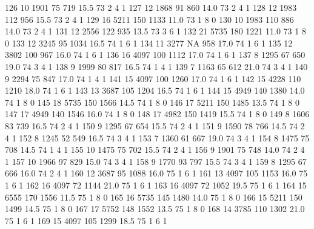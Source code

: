 \documentclass{article}
\begin{document}
\begin{Schunk}
\begin{Soutput}
126      10  1901  75  719 15.5  73      2       4        1
127      12  1868  91  860 14.0  73      2       4        1
128      12  1983 112  956 15.5  73      2       4        1
129      16  5211 150 1133 11.0  73      1       8        0
130      10  1983 110  886 14.0  73      2       4        1
131      12  2556 122  935 13.5  73      3       6        1
132      21  5735 180 1221 11.0  73      1       8        0
133      12  3245  95 1034 16.5  74      1       6        1
134      11  3277  NA  958 17.0  74      1       6        1
135      12  3802 100  967 16.0  74      1       6        1
136      16  4097 100 1112 17.0  74      1       6        1
137       8  1295  67  650 19.0  74      3       4        1
138       9  1999  80  817 16.5  74      1       4        1
139       7  1163  65  612 21.0  74      3       4        1
140       9  2294  75  847 17.0  74      1       4        1
141      15  4097 100 1260 17.0  74      1       6        1
142      15  4228 110 1210 18.0  74      1       6        1
143      13  3687 105 1204 16.5  74      1       6        1
144      15  4949 140 1380 14.0  74      1       8        0
145      18  5735 150 1566 14.5  74      1       8        0
146      17  5211 150 1485 13.5  74      1       8        0
147      17  4949 140 1546 16.0  74      1       8        0
148      17  4982 150 1419 15.5  74      1       8        0
149       8  1606  83  739 16.5  74      2       4        1
150       9  1295  67  654 15.5  74      2       4        1
151       9  1590  78  766 14.5  74      2       4        1
152       8  1245  52  549 16.5  74      3       4        1
153       7  1360  61  667 19.0  74      3       4        1
154       8  1475  75  708 14.5  74      1       4        1
155      10  1475  75  702 15.5  74      2       4        1
156       9  1901  75  748 14.0  74      2       4        1
157      10  1966  97  829 15.0  74      3       4        1
158       9  1770  93  797 15.5  74      3       4        1
159       8  1295  67  666 16.0  74      2       4        1
160      12  3687  95 1088 16.0  75      1       6        1
161      13  4097 105 1153 16.0  75      1       6        1
162      16  4097  72 1144 21.0  75      1       6        1
163      16  4097  72 1052 19.5  75      1       6        1
164      15  6555 170 1556 11.5  75      1       8        0
165      16  5735 145 1480 14.0  75      1       8        0
166      15  5211 150 1499 14.5  75      1       8        0
167      17  5752 148 1552 13.5  75      1       8        0
168      14  3785 110 1302 21.0  75      1       6        1
169      15  4097 105 1299 18.5  75      1       6        1

\end{Soutput}
\end{Schunk}
\end{document}
